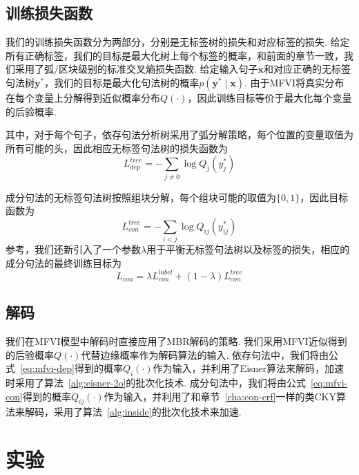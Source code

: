 \subsection{训练损失函数}

我们的训练损失函数分为两部分，分别是无标签树的损失和对应标签的损失.
给定所有正确标签，我们的目标是最大化树上每个标签的概率，和前面的章节一致，我们采用了弧/区块级别的标准交叉熵损失函数.
给定输入句子$\boldsymbol{x}$和对应正确的无标签句法树$\boldsymbol{y}^{\ast}$，我们的目标是最大化句法树的概率$p(\boldsymbol{y}^{\ast}\mid\boldsymbol{x})$.
由于MFVI将真实分布在每个变量上分解得到近似概率分布$Q(\cdot)$，因此训练目标等价于最大化每个变量的后验概率.

其中，对于每个句子，依存句法分析树采用了弧分解策略，每个位置的变量取值为所有可能的头，因此相应无标签句法树的损失函数为
\begin{equation}
	\label{eq:dep-vi-arc-loss}
	L_{dep}^{tree}=-\sum_{j\neq 0}\log Q_j(y^{\ast}_j)
\end{equation}

成分句法的无标签句法树按照组块分解，每个组块可能的取值为$\{0,1\}$，因此目标函数为
\begin{equation}
	\label{eq:con-vi-bracket-loss}
	L_{con}^{tree}=-\sum_{i<j}\log Q_{ij}(y^{\ast}_{ij})
\end{equation}
参考\citet{dozat-manning-2018-simpler}，我们还新引入了一个参数$\lambda$用于平衡无标签句法树以及标签的损失，相应的成分句法的最终训练目标为
\begin{equation}
	\label{eq:con-vi-loss}
	L_{con}=\lambda L_{con}^{label}+(1-\lambda)L_{con}^{tree}
\end{equation}

\subsection{解码}
我们在MFVI模型中解码时直接应用了MBR解码的策略.
我们采用MFVI近似得到的后验概率$Q(\cdot)$代替边缘概率作为解码算法的输入.
依存句法中，我们将由公式~\ref{eq:mfvi-dep}得到的概率$Q_i(\cdot)$作为输入，并利用了Eisner算法来解码，加速时采用了算法~\ref{alg:eisner-2o}的批次化技术.
成分句法中，我们将由公式~\ref{eq:mfvi-con}得到的概率$Q_{ij}(\cdot)$作为输入，并利用了和章节~\ref{cha:con-crf}一样的类CKY算法来解码，采用了算法~\ref{alg:inside}的批次化技术来加速.

\section{实验}\label{sec:vi-exp}


